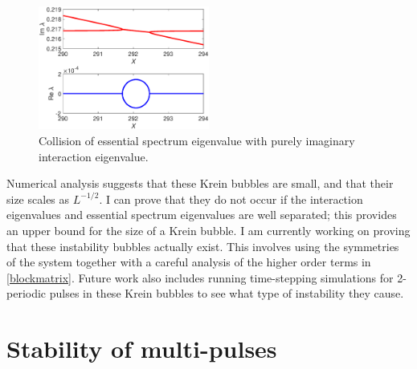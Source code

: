 \documentclass[12pt,reqno,oneside]{article}
\theoremstyle{definition}
\theoremstyle{remark}
\begin{document}
\pagebreak
\begin{figure}
\includegraphics[width=0.5\textwidth]{images/kreinbubble1}
\caption{Collision of essential spectrum eigenvalue with purely imaginary interaction eigenvalue.}
\label{fig:kreinbubble1}
\end{figure}
Numerical analysis suggests that these Krein bubbles are small, and that their size scales as $L^{-1/2}$. I can prove that they do not occur if the interaction eigenvalues and essential spectrum eigenvalues are well separated; this provides an upper bound for the size of a Krein bubble. I am currently working on proving that these instability bubbles actually exist. This involves using the symmetries of the system together with a careful analysis of the higher order terms in \eqref{blockmatrix}. Future work also includes running time-stepping simulations for 2-periodic pulses in these Krein bubbles to see what type of instability they cause.

\section{Stability of multi-pulses}
\end{document}
